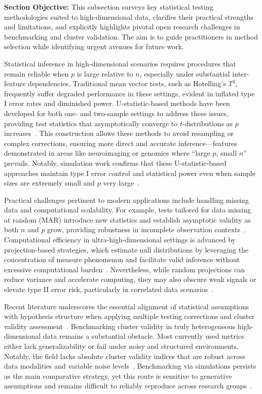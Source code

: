 \documentclass[sigconf]{acmart}
\begin{document}
\textbf{Section Objective:} This subsection surveys key statistical testing methodologies suited to high-dimensional data, clarifies their practical strengths and limitations, and explicitly highlights pivotal open research challenges in benchmarking and cluster validation. The aim is to guide practitioners in method selection while identifying urgent avenues for future work.

Statistical inference in high-dimensional scenarios requires procedures that remain reliable when $p$ is large relative to $n$, especially under substantial inter-feature dependencies. Traditional mean vector tests, such as Hotelling’s $T^2$, frequently suffer degraded performance in these settings, evident in inflated type I error rates and diminished power. U-statistic-based methods have been developed for both one- and two-sample settings to address these issues, providing test statistics that asymptotically converge to $t$-distributions as $p$ increases~\cite{ref91,ref95}. This construction allows these methods to avoid resampling or complex corrections, ensuring more direct and accurate inference—features demonstrated in areas like neuroimaging or genomics where “large $p$, small $n$” prevails. Notably, simulation work confirms that these U-statistic-based approaches maintain type I error control and statistical power even when sample sizes are extremely small and $p$ very large~\cite{ref95}.

Practical challenges pertinent to modern applications include handling missing data and computational scalability. For example, tests tailored for data missing at random (MAR) introduce new statistics and establish asymptotic validity as both $n$ and $p$ grow, providing robustness in incomplete observation contexts~\cite{ref94}. Computational efficiency in ultra-high-dimensional settings is advanced by projection-based strategies, which estimate null distributions by leveraging the concentration of measure phenomenon and facilitate valid inference without excessive computational burden~\cite{ref91,ref92,ref93}. Nevertheless, while random projections can reduce variance and accelerate computing, they may also obscure weak signals or elevate type II error risk, particularly in correlated data scenarios~\cite{ref93}.

Recent literature underscores the essential alignment of statistical assumptions with hypothesis structure when applying multiple testing corrections and cluster validity assessment~\cite{ref95,ref110,ref113}. Benchmarking cluster validity in truly heterogeneous high-dimensional data remains a substantial obstacle. Most currently used metrics either lack generalizability or fail under noisy and structured environments. Notably, the field lacks absolute cluster validity indices that are robust across data modalities and variable noise levels~\cite{ref113}. Benchmarking via simulations persists as the main comparative strategy, yet this route is sensitive to generative assumptions and remains difficult to reliably reproduce across research groups~\cite{ref93,ref95}.
\end{document}
